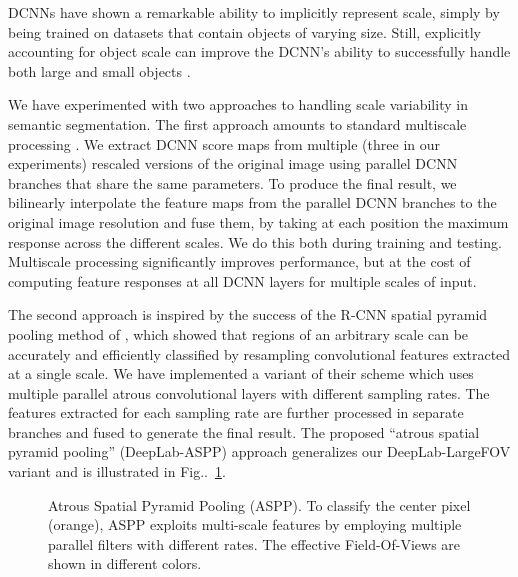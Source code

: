 \documentclass[10pt,journal,compsoc]{IEEEtran}
\makeatletter
\newcommand{\figref}[1]{Fig\onedot~\ref{#1}}
\def\onedot{\ifx\@let@token.\else.\null\fi\xspace}
\makeatother
\begin{document}
DCNNs have shown a remarkable
ability to implicitly represent scale, simply by being trained on datasets that
contain objects of varying size. Still, explicitly accounting for object scale
can improve the DCNN's ability to successfully handle both
large and small objects \cite{papandreou2014untangling}.

We have experimented with two approaches to handling
 scale variability in semantic segmentation.
The first approach amounts to standard multiscale
processing \cite{chen2015attention, kokkinos2016pushing}. We extract DCNN score
maps from multiple (three in our experiments) rescaled versions of the original
image using parallel DCNN branches that share the same parameters. To produce
the final result, we bilinearly interpolate the feature maps from the parallel
DCNN branches to the original image resolution and fuse them, by taking at each
position the maximum response across the different scales. We do this both
during training and testing. Multiscale processing significantly improves
performance, but at the cost of computing feature responses at all DCNN layers for
multiple scales of input. 

The second approach is inspired by the success of the R-CNN spatial pyramid pooling method of \cite{he2014spatial},
which showed that regions of an arbitrary scale can be accurately and efficiently classified by resampling 
convolutional features extracted at a single scale.
 We have implemented a variant of their scheme which uses multiple
parallel atrous convolutional layers with different sampling rates. The features extracted for each sampling
rate are further processed in separate branches and fused to generate the final
result. The proposed ``atrous spatial pyramid pooling'' (DeepLab-ASPP) approach
generalizes our DeepLab-LargeFOV variant and is illustrated in \figref{fig:aspp_fov}.



\begin{figure}[!t]
  \centering
  \caption{Atrous Spatial Pyramid Pooling (ASPP). To classify the center pixel (orange),
    ASPP exploits multi-scale features by employing multiple parallel filters with
    different rates. The effective Field-Of-Views are shown in different colors.}
  \label{fig:aspp_fov}
\end{figure}
\end{document}
